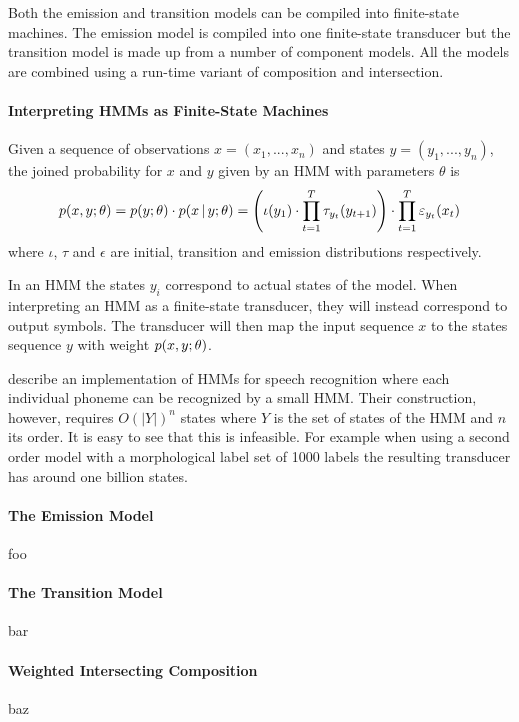 Both the emission and transition models can be compiled into
finite-state machines. The emission model is compiled into one
finite-state transducer but the transition model is made up from a
number of component models. All the models are combined using a
run-time variant of composition and intersection.

\paragraph{Interpreting HMMs as Finite-State Machines} Given a
sequence of observations $x = (x_1, ..., x_n)$ and states $y = (y_1,
..., y_n)$, the joined probability for $x$ and $y$ given by an HMM
with parameters $\theta$ is
$$p(x,y\mbox{$ ; \, $}\theta) = p(y\mbox{$ ; \, $}\theta)\cdot p(x \mbox{$ \, | \, $} y\mbox{$ ; \, $}\theta)= \Bigg(\iota(y_1) \cdot \prod_{t = 1}^{T} \tau_{y_t}(y_{t + 1})\Bigg) \cdot \prod_{t = 1}^T \varepsilon_{y_t}(x_t)$$
where $\iota$, $\tau$ and $\epsilon$ are initial, transition and
emission distributions respectively.

In an HMM the states $y_i$ correspond to actual states of the
model. When interpreting an HMM as a finite-state transducer, they
will instead correspond to output symbols. The transducer will then
map the input sequence $x$ to the states sequence $y$ with weight
$p(x,y\mbox{$ ; \, $}\theta)$.

\cite{Mohri2002} describe an implementation of HMMs for speech
recognition where each individual phoneme can be recognized by a small
HMM. Their construction, however, requires $O(|Y|)^n$ states where $Y$
is the set of states of the HMM and $n$ its order. It is easy to see
that this is infeasible. For example when using a second order model
with a morphological label set of 1000 labels the resulting transducer
has around one billion states.

\paragraph{The Emission Model} foo

\paragraph{The Transition Model} bar

\paragraph{Weighted Intersecting Composition} baz